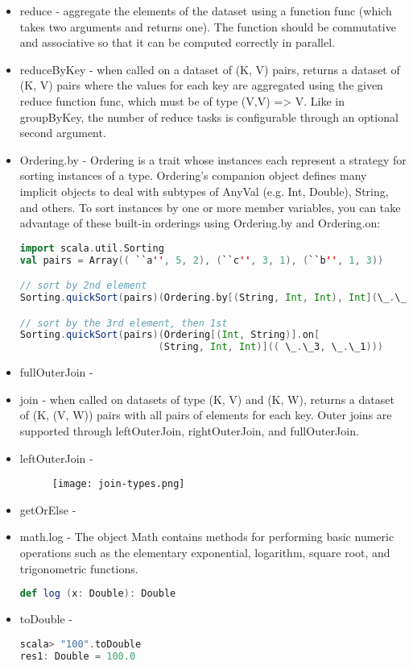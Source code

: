 \documentclass[paper=a4, fontsize=11pt]{scrartcl}
\numberwithin{equation}{section}		%
\numberwithin{figure}{section}			%
\numberwithin{table}{section}				%
\begin{document}
\begin{itemize}
\begin{lstlisting}
		\end{lstlisting}
	\item reduce - aggregate the elements of the dataset using a function func (which takes two arguments and returns one). The function should be commutative and associative so that it can be computed correctly in parallel.  
	\item reduceByKey - when called on a dataset of (K, V) pairs, returns a dataset of (K, V) pairs where the values for each key are aggregated using the given reduce function func, which must be of type (V,V) => V. Like in groupByKey, the number of reduce tasks is configurable through an optional second argument.  
	\item Ordering.by - Ordering is a trait whose instances each represent a strategy for sorting instances of a type. Ordering's companion object defines many implicit objects to deal with subtypes of AnyVal (e.g. Int, Double), String, and others. To sort instances by one or more member variables, you can take advantage of these built-in orderings using Ordering.by and Ordering.on:
		\begin{lstlisting}[language=scala]
import scala.util.Sorting
val pairs = Array(( ``a'', 5, 2), (``c'', 3, 1), (``b'', 1, 3))

// sort by 2nd element
Sorting.quickSort(pairs)(Ordering.by[(String, Int, Int), Int](\_.\_2))

// sort by the 3rd element, then 1st
Sorting.quickSort(pairs)(Ordering[(Int, String)].on[
                        (String, Int, Int)](( \_.\_3, \_.\_1)))
		\end{lstlisting}

	\item fullOuterJoin - 
	\item join - when called on datasets of type (K, V) and (K, W), returns a dataset of (K, (V, W)) pairs with all pairs of elements for each key. Outer joins are supported through leftOuterJoin, rightOuterJoin, and fullOuterJoin. 
	\item leftOuterJoin -

		\begin{figure}[!htb]
			\texttt{[image: join-types.png]}
		\end{figure}

	\item getOrElse -  
	\item math.log - The object Math contains methods for performing basic numeric operations such as the elementary exponential, logarithm, square root, and trigonometric functions.  
\begin{lstlisting}[language=scala]
def log (x: Double): Double 
\end{lstlisting}
	\item toDouble -
\begin{lstlisting}[language=scala]
scala> "100".toDouble
res1: Double = 100.0


\end{lstlisting}
\end{itemize}
\end{document}
